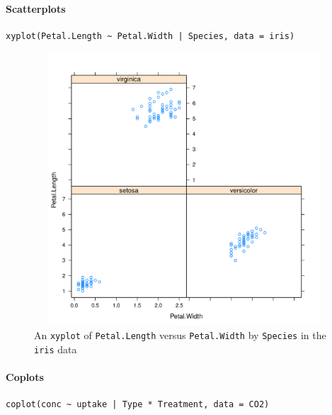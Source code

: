 \documentclass[captions=tableheading]{scrbook}
\begin{document}
\paragraph*{Scatterplots}


\begin{verbatim}
xyplot(Petal.Length ~ Petal.Width | Species, data = iris)
\end{verbatim}





\begin{figure}[th]
    \includegraphics[width=5in, height=4in]{img/xyplot.pdf}
    \caption[An \texttt{xyplot} of \texttt{Petal.Length} versus \texttt{Petal.Width} by \texttt{Species}]{An \texttt{xyplot} of \texttt{Petal.Length} versus \texttt{Petal.Width} by \texttt{Species} in the \texttt{iris} data}
    \label{fig:xyplot}
  \end{figure}


\paragraph*{Coplots}


\begin{verbatim}
coplot(conc ~ uptake | Type * Treatment, data = CO2)
\end{verbatim}
\end{document}
